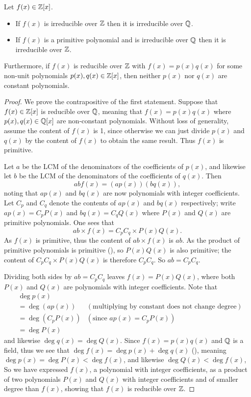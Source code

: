 \begin{theorem}\label{thrm-irreducible-over-Z-means-irreducible-over-Q}
    Let $f(x) \in \mathbb{Z}[x]$.
    \begin{itemize}
        \item If $f(x)$ is irreducible over $\mathbb{Z}$ then it is irreducible over $\mathbb{Q}$.
        \item If $f(x)$ is a primitive polynomial and is irreducible over $\mathbb{Q}$ then it is irreducible over $\mathbb{Z}$.
    \end{itemize}
    Furthermore, if $f(x)$ is reducible over $\mathbb{Z}$ with $f(x) = p(x)q(x)$ for some non-unit polynomials $p(x), q(x) \in \mathbb{Z}[x]$, then neither $p(x)$ nor $q(x)$ are constant polynomials.
\end{theorem}
\begin{proof}
    We prove the contrapositive of the first statement. Suppose that $f(x) \in \mathbb{Z}[x]$ is reducible over $\mathbb{Q}$, meaning that $f(x) = p(x)q(x)$ where $p(x), q(x) \in \mathbb{Q}[x]$ are non-constant polynomials. Without loss of generality, assume the content of $f(x)$ is 1, since otherwise we can just divide $p(x)$ and $q(x)$ by the content of $f(x)$ to obtain the same result. Thus $f(x)$ is primitive.

    Let $a$ be the LCM of the denominators of the coefficients of $p(x)$, and likewise let $b$ be the LCM of the denominators of the coefficients of $q(x)$. Then
    \[
        abf(x) = (ap(x))(bq(x)),
    \]
    noting that $ap(x)$ and $bq(x)$ are now polynomials with integer coefficients. Let $C_p$ and $C_q$ denote the contents of $ap(x)$ and $bq(x)$ respectively; write $ap(x) = C_pP(x)$ and $bq(x) = C_qQ(x)$ where $P(x)$ and $Q(x)$ are primitive polynomials. One sees that
    \[
        ab \times f(x) = C_pC_q \times P(x)Q(x).
    \]
    As $f(x)$ is primitive, thus the content of $ab \times f(x)$ is $ab$. As the product of primitive polynomials is primitive (), so $P(x)Q(x)$ is also primitive; the content of $C_pC_q \times P(x)Q(x)$ is therefore $C_pC_q$. So $ab = C_pC_q$.

    Dividing both sides by $ab = C_pC_q$ leaves $f(x) = P(x)Q(x)$, where both $P(x)$ and $Q(x)$ are polynomials with integer coefficients. Note that
    \begin{align*}
        &\deg p(x)\\
        &= \deg (ap(x)) & (\text{multiplying by constant does not change degree})\\
        &= \deg(C_pP(x)) & (\text{since } ap(x) = C_pP(x))\\
        &= \deg P(x)
    \end{align*}
    and likewise $\deg q(x) = \deg Q(x)$. Since $f(x) = p(x)q(x)$ and $\mathbb{Q}$ is a field, thus we see that $\deg f(x) = \deg p(x) + \deg q(x)$ (), meaning $\deg p(x) = \deg P(x) < \deg f(x)$, and likewise $\deg Q(x) < \deg f(x)$, So we have expressed $f(x)$, a polynomial with integer coefficients, as a product of two polynomials $P(x)$ and $Q(x)$ with integer coefficients and of smaller degree than $f(x)$, showing that $f(x)$ is reducible over $\mathbb{Z}$.


\end{proof}
